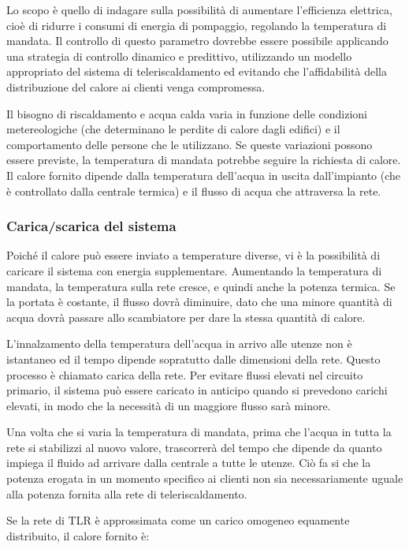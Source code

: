 \documentclass[laurea,oneside,11pt]{USiena_tesiLM}
\begin{document}
Lo scopo è quello di indagare sulla possibilità di aumentare l'efficienza elettrica, cioè di ridurre i consumi di energia di pompaggio, regolando la temperatura di mandata.
Il controllo di questo parametro dovrebbe essere possibile applicando una strategia di controllo dinamico e predittivo, utilizzando un modello appropriato del sistema di teleriscaldamento ed evitando che l'affidabilità della distribuzione del calore ai clienti venga compromessa.

Il bisogno di riscaldamento e acqua calda varia in funzione delle condizioni metereologiche (che determinano le perdite di calore dagli edifici) e il comportamento delle persone che le utilizzano. Se queste variazioni possono essere previste, la temperatura di mandata potrebbe seguire la richiesta di calore. Il calore fornito  dipende dalla temperatura dell'acqua in uscita dall'impianto (che è controllato dalla centrale termica) e il flusso di acqua che attraversa la rete. 

\subsubsection{Carica/scarica del sistema}
Poiché il calore può essere inviato a temperature diverse, vi è la possibilità di caricare il sistema con energia supplementare.
Aumentando la temperatura di mandata, la temperatura sulla rete cresce, e quindi anche la potenza termica. Se la portata è costante, il flusso dovrà diminuire, dato che una minore quantità di acqua dovrà passare allo scambiatore per dare la stessa quantità di calore. 

L'innalzamento della temperatura dell'acqua in arrivo alle utenze non è istantaneo ed il tempo dipende sopratutto dalle dimensioni della rete. Questo processo è chiamato carica della rete. Per evitare flussi elevati nel circuito primario, il sistema può essere caricato in anticipo quando si prevedono carichi elevati, in modo che la necessità di un maggiore flusso sarà minore.

Una volta che si varia la temperatura di mandata, prima che l'acqua in tutta la rete si stabilizzi al nuovo valore, trascorrerà del tempo che dipende da quanto  impiega il fluido ad arrivare dalla centrale a tutte le utenze. Ciò fa si che la potenza erogata in un momento specifico ai clienti non sia necessariamente uguale alla potenza fornita alla rete di teleriscaldamento.

Se la rete di TLR è approssimata come un carico omogeneo equamente distribuito, il calore fornito è:
\end{document}

